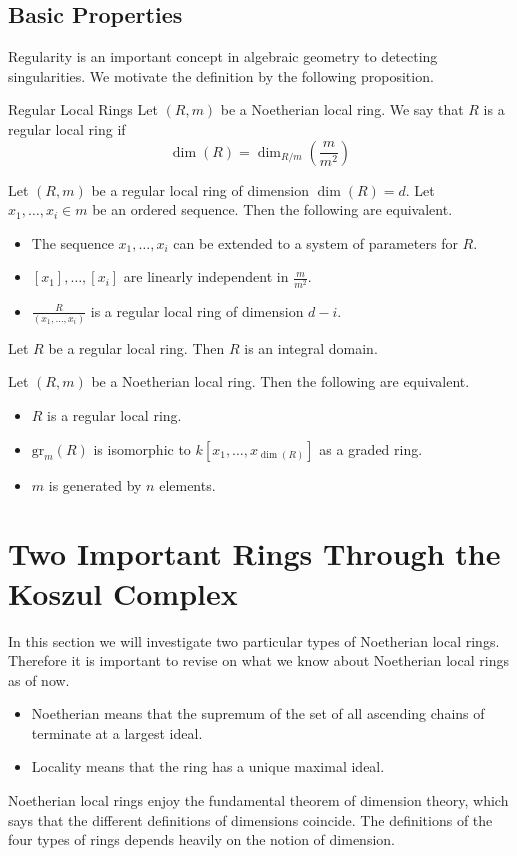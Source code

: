 \documentclass[a4paper]{article}
\begin{document}
\subsection{Basic Properties}
Regularity is an important concept in algebraic geometry to detecting singularities. We motivate the definition by the following proposition. 

\begin{defn}{Regular Local Rings}{} Let $(R,m)$ be a Noetherian local ring. We say that $R$ is a regular local ring if $$\dim(R)=\dim_{R/m}\left(\frac{m}{m^2}\right)$$
\end{defn}

\begin{prp}{}{} Let $(R,m)$ be a regular local ring of dimension $\dim(R)=d$. Let $x_1,\dots,x_i\in m$ be an ordered sequence.  Then the following are equivalent. 
\begin{itemize}
\item The sequence $x_1,\dots,x_i$ can be extended to a system of parameters for $R$. 
\item $[x_1],\dots,[x_i]$ are linearly independent in $\frac{m}{m^2}$. 
\item $\frac{R}{(x_1,\dots,x_i)}$ is a regular local ring of dimension $d-i$. 
\end{itemize}
\end{prp}

\begin{prp}{}{} Let $R$ be a regular local ring. Then $R$ is an integral domain. 
\end{prp}

\begin{prp}{}{} Let $(R,m)$ be a Noetherian local ring. Then the following are equivalent. 
\begin{itemize}
\item $R$ is a regular local ring. 
\item $\text{gr}_m(R)$ is isomorphic to $k[x_1,\dots,x_{\dim(R)}]$ as a graded ring. 
\item $m$ is generated by $n$ elements. 
\end{itemize}
\end{prp}

\pagebreak
\section{Two Important Rings Through the Koszul Complex}
In this section we will investigate two particular types of Noetherian local rings. Therefore it is important to revise on what we know about Noetherian local rings as of now. 
\begin{itemize}
\item Noetherian means that the supremum of the set of all ascending chains of terminate at a largest ideal. 
\item Locality means that the ring has a unique maximal ideal. 
\end{itemize}
Noetherian local rings enjoy the fundamental theorem of dimension theory, which says that the different definitions of dimensions coincide. The definitions of the four types of rings depends heavily on the notion of dimension. 
\end{document}
